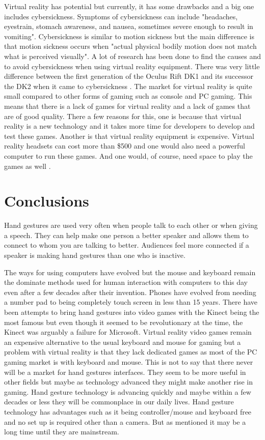 \documentclass{article}
\begin{document}
Virtual reality has potential but currently, it has some drawbacks and a big one includes cybersickness. Symptoms of cybersickness can include "headaches, eyestrain, stomach awareness, and nausea, sometimes severe enough to result in vomiting". Cybersickness is similar to motion sickness but the main difference is that motion sickness occurs when "actual physical bodily motion does not match what is perceived visually". A lot of research has been done to find the causes and to avoid cybersickness when using virtual reality equipment. There was very little difference between the first generation of the Oculus Rift DK1 and its successor the DK2 when it came to cybersickness \cite{shafer2019factors}. The market for virtual reality is quite small compared to other forms of gaming such as console and PC gaming. This means that there is a lack of games for virtual reality and a lack of games that are of good quality. There a few reasons for this, one is because that virtual reality is a new technology and it takes more time for developers to develop and test these games. Another is that virtual reality equipment is expensive. Virtual reality headsets can cost more than \$500 and one would also need a powerful computer to run these games. And one would, of course, need space to play the games as well \cite{shelstad2017gaming}.

\section*{Conclusions}
Hand gestures are used very often when people talk to each other or when giving a speech. They can help make one person a better speaker and allows them to connect to whom you are talking to better. Audiences feel more connected if a speaker is making hand gestures than one who is inactive.

The ways for using computers have evolved but the mouse and keyboard remain the dominate methods used for human interaction with computers to this day even after a few decades after their invention. Phones have evolved from needing a number pad to being completely touch screen in less than 15 years. There have been attempts to bring hand gestures into video games with the Kinect being the most famous but even though it seemed to be revolutionary at the time, the Kinect was arguably a failure for Microsoft. Virtual reality video games remain an expensive alternative to the usual keyboard and mouse for gaming but a problem with virtual reality is that they lack dedicated games as most of the PC gaming market is with keyboard and mouse. This is not to say that there never will be a market for hand gestures interfaces. They seem to be more useful in other fields but maybe as technology advanced they might make another rise in gaming. Hand gesture technology is advancing quickly and maybe within a few decades or less they will be commonplace in our daily lives. Hand gesture technology has advantages such as it being controller/mouse and keyboard free and no set up is required other than a camera. But as mentioned it may be a long time until they are mainstream.



\end{document}
